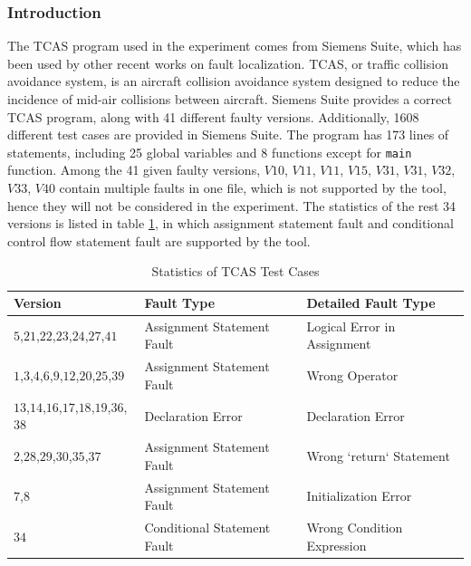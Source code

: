 \subsubsection{Introduction}
The TCAS program used in the experiment comes from Siemens Suite, which has been used by other recent works on fault localization\cite{EotEoDaCBTAC,ESoaRTST}.
TCAS, or traffic collision avoidance system, is an aircraft collision avoidance system designed to reduce the incidence of mid-air collisions between aircraft\cite{TCAS}.
Siemens Suite provides a correct TCAS program, along with 41 different faulty versions. Additionally, 1608 different test cases are provided in Siemens Suite.
The program has 173 lines of statements, including 25 global variables and 8 functions except for \lstinline|main| function.
Among the 41 given faulty versions, $V10$, $V11$, $V11$, $V15$, $V31$, $V31$, $V32$, $V33$, $V40$ contain multiple faults in one file, which is not supported by the tool, hence they will not be considered in the experiment.
The statistics of the rest 34 versions is listed in table \ref{table:SoTCASTC}, in which assignment statement fault and conditional control flow statement fault are supported by the tool.

\begin{table}
\small
\center
\caption{Statistics of TCAS Test Cases}
\label{table:SoTCASTC}
\begin{tabular}{lll}
\hline
Version                                 & Fault Type                  & Detailed Fault Type         \\
\hline
$5$,$21$,$22$,$23$,$24$,$27$,$41$       & Assignment Statement Fault  & Logical Error in Assignment \\
$1$,$3$,$4$,$6$,$9$,$12$,$20$,$25$,$39$ & Assignment Statement Fault  & Wrong Operator              \\
$13$,$14$,$16$,$17$,$18$,$19$,$36$,$38$ & Declaration Error           & Declaration Error           \\
$2$,$28$,$29$,$30$,$35$,$37$            & Assignment Statement Fault  & Wrong `return` Statement    \\
$7$,$8$                                 & Assignment Statement Fault  & Initialization Error        \\
$34$                                    & Conditional Statement Fault & Wrong Condition Expression  \\
\hline
\end{tabular}
\end{table}

